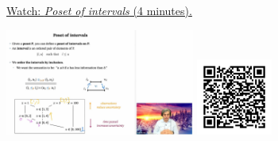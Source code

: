 
\begin{minipage}{10cm}
    \href{https://act4e-spring21.netlify.app/videos/spring2021-tradeoffs:tradeoffs:orders:interval-poset.html}{Watch: \emph{Poset of intervals} (4 minutes).}
        
    \href{https://act4e-spring21.netlify.app/videos/spring2021-tradeoffs:tradeoffs:orders:interval-poset.html}{\includegraphics[height=3.5cm]{spring2021-tradeoffs:tradeoffs:orders:interval-poset/thumbnails.jpg}}
    \href{https://act4e-spring21.netlify.app/videos/spring2021-tradeoffs:tradeoffs:orders:interval-poset.html}{\includegraphics[height=2.5cm]{spring2021-tradeoffs:tradeoffs:orders:interval-poset/qrcode.png}}
\end{minipage}
